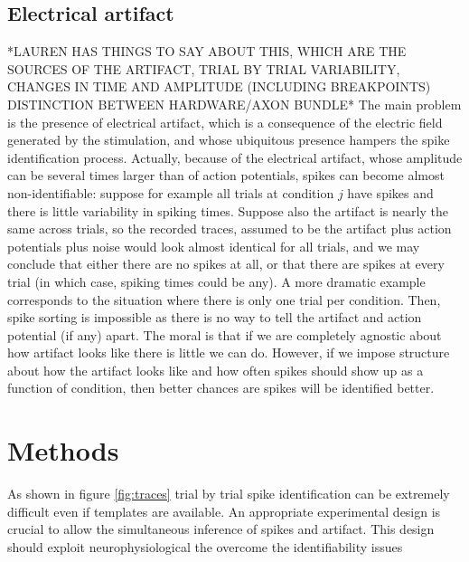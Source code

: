 \documentclass[12pt,letterpaper,fleqn]{article}
\begin{document}
\subsection{Electrical artifact}
*LAUREN HAS THINGS TO SAY ABOUT THIS, WHICH ARE THE SOURCES OF THE ARTIFACT, TRIAL BY TRIAL VARIABILITY,  CHANGES IN TIME AND AMPLITUDE (INCLUDING BREAKPOINTS) DISTINCTION BETWEEN HARDWARE/AXON BUNDLE*
 The main problem is the presence of electrical artifact, which is a consequence of the electric field generated by the stimulation, and whose ubiquitous presence hampers the spike identification process. Actually, because of the electrical artifact, whose amplitude can be several times larger than of action potentials, spikes can become almost non-identifiable: suppose for example all trials at condition $j$ have spikes and there is little variability in spiking times. Suppose also the artifact is nearly the same across trials, so the recorded traces, assumed to be the artifact plus action potentials plus noise would look almost identical for all trials, and we may conclude that either there are no spikes at all, or that there are spikes at every trial (in which case, spiking times could be any). A more dramatic example corresponds to the situation where there is only one trial per condition. Then, spike sorting is impossible as there is no way to tell the artifact and action potential (if any) apart. The moral is that if we are completely agnostic about how artifact looks like there is little we can do. However, if we impose structure about how the artifact looks like and how often spikes should show up as a function of condition, then better chances are spikes will be identified better.   
\section{Methods}

As shown in figure \ref{fig:traces} trial by trial spike identification can be extremely difficult even if templates are available. An appropriate experimental design is crucial to allow the simultaneous inference of spikes and artifact. This design should exploit neurophysiological the overcome the identifiability issues
\end{document}
